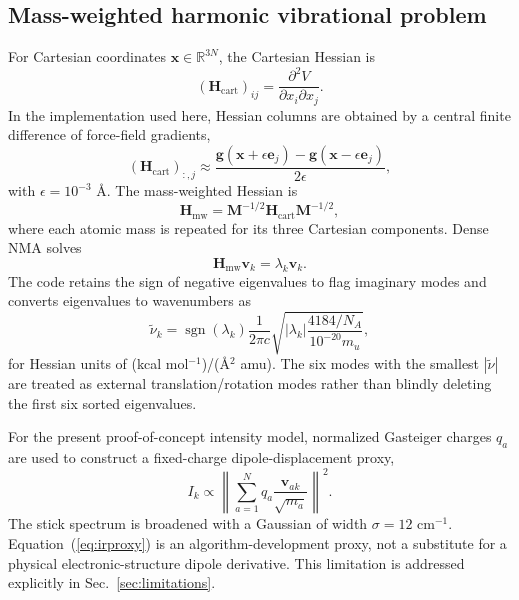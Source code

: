 \documentclass[aip,jcp,reprint,amsmath,amssymb,floatfix]{revtex4-2}
\newcommand{\Hmw}{\mathbf{H}_{\mathrm{mw}}}
\newcommand{\Hcart}{\mathbf{H}_{\mathrm{cart}}}
\begin{document}
\subsection{Mass-weighted harmonic vibrational problem}
For Cartesian coordinates $\mathbf{x}\in\mathbb{R}^{3N}$, the Cartesian Hessian is
\begin{equation}
(\Hcart)_{i j}=\frac{\partial^2 V}{\partial x_i\partial x_j}.
\label{eq:hcart}
\end{equation}
In the implementation used here, Hessian columns are obtained by a central finite difference of force-field gradients,
\begin{equation}
(\Hcart)_{:,j}\approx
\frac{\mathbf{g}(\mathbf{x}+\epsilon\mathbf{e}_j)-
      \mathbf{g}(\mathbf{x}-\epsilon\mathbf{e}_j)}{2\epsilon},
\label{eq:fdhessian}
\end{equation}
with $\epsilon=10^{-3}$ \AA.  The mass-weighted Hessian is
\begin{equation}
\Hmw=\mathbf{M}^{-1/2}\Hcart\mathbf{M}^{-1/2},
\label{eq:massweight}
\end{equation}
where each atomic mass is repeated for its three Cartesian components. Dense NMA solves
\begin{equation}
\Hmw\mathbf{v}_k=\lambda_k\mathbf{v}_k.
\label{eq:eigenproblem}
\end{equation}
The code retains the sign of negative eigenvalues to flag imaginary modes and converts eigenvalues to wavenumbers as
\begin{equation}
\widetilde{\nu}_k = \operatorname{sgn}(\lambda_k)
\frac{1}{2\pi c}
\sqrt{\left|\lambda_k\right|\frac{4184/N_A}{10^{-20}m_u}},
\label{eq:freqconversion}
\end{equation}
for Hessian units of (kcal mol$^{-1}$)/(\AA$^2$ amu). The six modes with the smallest $|\widetilde{\nu}|$ are treated as external translation/rotation modes rather than blindly deleting the first six sorted eigenvalues.

For the present proof-of-concept intensity model, normalized Gasteiger charges $q_a$ are used to construct a fixed-charge dipole-displacement proxy,\cite{Gasteiger1980}
\begin{equation}
I_k \propto
\left\lVert
\sum_{a=1}^{N}q_a
\frac{\mathbf{v}_{ak}}{\sqrt{m_a}}
\right\rVert^2.
\label{eq:irproxy}
\end{equation}
The stick spectrum is broadened with a Gaussian of width $\sigma=12$ cm$^{-1}$. Equation~(\ref{eq:irproxy}) is an algorithm-development proxy, not a substitute for a physical electronic-structure dipole derivative. This limitation is addressed explicitly in Sec.~\ref{sec:limitations}.
\end{document}
